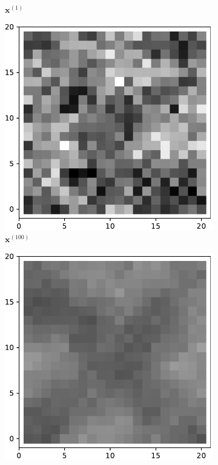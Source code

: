 \begin{figure}[!h]
\begin{subfigure}[b]{0.24\textwidth}
            \caption[]%
            {{\small $\mathbf{x}^{(1)}$}}    
            \label{fig:15d21}
        \end{subfigure}
        \begin{subfigure}[b]{0.24\textwidth}   
            \centering 
            \includegraphics[width=\textwidth]{./img/15d2-99.pdf}
            \caption[]%
            {{\small $\mathbf{x}^{(100)}$}}    
            \label{fig:15d2100}
        \end{subfigure}
        \begin{subfigure}[b]{0.24\textwidth}   
            \centering 
            \includegraphics[width=\textwidth]{./img/15d2mean.pdf}

\end{subfigure}
\end{figure}
